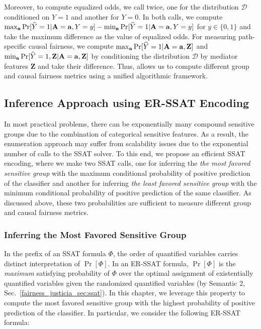 Moreover, to compute equalized odds, we call {\justicia} twice, one for the distribution $ \mathcal{D} $ conditioned on $ Y = 1  $ and another for $ Y = 0 $. In both calls, we compute $ \max_{ \mathbf{a}} \Pr[\widehat{Y} =1 | \mathbf{A} = \mathbf{a}, Y = y ]  - \min_{ \mathbf{a}} \Pr[\widehat{Y} =1 | \mathbf{A} = \mathbf{a}, Y = y ] $ for $ y \in \{0,1\} $ and take the  maximum difference as the value of equalized odds. 
For measuring path-specific causal fairness, we compute  $ \max_{ \mathbf{a}} \Pr[\widehat{Y} =1 | \mathbf{A} = \mathbf{a}, \mathbf{Z}] $ and  $ \min_{ \mathbf{a}} \Pr[\widehat{Y} =1, \mathbf{Z}| \mathbf{A} = \mathbf{a} , \mathbf{Z}] $ by conditioning the distribution $ \mathcal{D} $ by mediator features $ \mathbf{Z} $ and take their difference. Thus, {\justiciaenum} allows us to compute different group and causal fairness metrics using a unified algorithmic framework.





\subsection{Inference Approach using ER-SSAT Encoding}
\label{fairness_justicia_sec:learn_ssat}
In most practical problems, there can be exponentially many compound sensitive groups due to the combination of categorical sensitive features.  As a result, the enumeration approach may suffer from scalability issues due to the exponential number of calls to the SSAT solver. To this end, we propose an efficient SSAT encoding, where we make two SSAT calls, one for inferring the \emph{the most favored sensitive group} with the maximum conditional probability of positive prediction of the classifier and another for inferring \emph{the least favored sensitive group} with the minimum conditional probability of positive prediction of the same classifier. As discussed above, these two probabilities are sufficient to measure different group and causal fairness metrics.



\subsubsection{Inferring the Most Favored Sensitive Group}
In the prefix of an SSAT formula $ \Phi $, the order of quantified variables carries distinct interpretation of  $ \Pr[\Phi] $.   In an ER-SSAT formula, $ \Pr[\Phi] $ is the \textit{maximum} satisfying probability of $ \Phi $ over the optimal assignment of existentially quantified variables given the randomized quantified variables (by Semantic 2, Sec.~\ref{fairness_justicia_sec:ssat}). In this chapter, we leverage this property to compute the most favored sensitive group with the highest probability of positive prediction of the classifier. In particular, we consider the following ER-SSAT formula:

